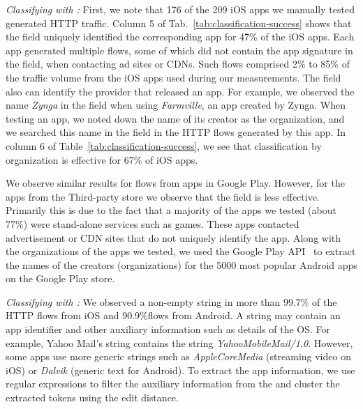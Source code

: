 \emph{Classifying with \httphost:}
First, we note that 176 of the 209 iOS apps we manually tested generated HTTP traffic.
Column 5 of Tab.~\ref{tab:classification-success} shows that the \httphost field uniquely identified the corresponding app for 47\% of the iOS apps. 
Each app generated multiple flows, some of which did not contain the app signature in the \httphost field, \eg when contacting ad sites or CDNs. 
Such flows comprised 2\% to 85\% of the traffic volume from the iOS apps used during our measurements. 
The \httphost field also can identify the provider that released an app.
For example, we observed the name \emph{Zynga} in the \httphost field when using \emph{Farmville}, an app created by Zynga.
When testing an app, we noted down the name of its creator as the organization, and we searched this name in the \httphost field in the HTTP flows generated by this app.  
In column 6 of Table~\ref{tab:classification-success}, we see that classification by organization is effective for 67\% of iOS apps. 

We observe similar results for flows from apps in Google Play.
However, for the apps from the Third-party store we observe that the \httphost field is less effective. 
Primarily this is due to the fact that a majority of the apps we tested (about 77\%) were stand-alone services such as games. 
These apps contacted advertisement or CDN sites that do not uniquely identify the app.
Along with the organizations of the apps we tested, we used the Google Play API~\cite{googleplay:api} to extract the names of the creators (organizations) for the 5000 most popular Android apps on the Google Play store. 

\emph{Classifying with \useragent:} 
We observed a non-empty \useragent string in more than 99.7\% of the HTTP flows from iOS and 90.9\%flows from Android. 
A \useragent string may contain an app identifier and other auxiliary information such as details of the OS. 
For example, Yahoo Mail's \useragent string contains the string \emph{YahooMobileMail/1.0}. 
However, some apps use more generic \useragent strings such as \emph{AppleCoreMedia} (streaming video on iOS) or \emph{Dalvik} (generic text for Android). 
To extract the app information, we use regular expressions to filter the auxiliary information from the \useragent and cluster the extracted tokens using the edit distance.

